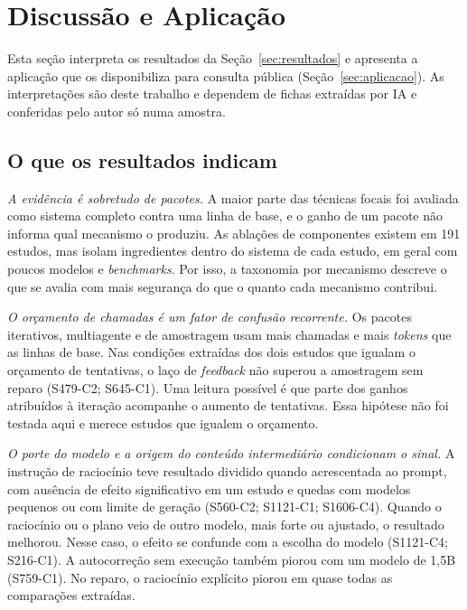 \section{Discussão e Aplicação}\label{sec:discussao}
Esta seção interpreta os resultados da Seção~\ref{sec:resultados} e apresenta a aplicação que os disponibiliza para
consulta pública (Seção~\ref{sec:aplicacao}). As interpretações são deste trabalho e
dependem de fichas extraídas por IA e conferidas pelo autor só numa amostra.

\subsection{O que os resultados indicam}
\textit{A evidência é sobretudo de pacotes.} A maior parte das técnicas focais foi avaliada como sistema completo
contra uma linha de base, e o ganho de um pacote não informa qual mecanismo o produziu. As ablações de componentes
existem em 191 estudos, mas isolam ingredientes dentro do sistema de cada estudo, em geral com poucos modelos e
\textit{benchmarks}. Por isso, a taxonomia por mecanismo descreve o que se avalia com mais segurança do que o
quanto cada mecanismo contribui.

\textit{O orçamento de chamadas é um fator de confusão recorrente.} Os pacotes iterativos, multiagente e de
amostragem usam mais chamadas e mais \textit{tokens} que as linhas de base. Nas condições extraídas dos dois estudos que igualam o
orçamento de tentativas, o laço de \textit{feedback} não superou a amostragem sem reparo (S479-C2; S645-C1).
Uma leitura possível é que parte dos ganhos atribuídos à iteração acompanhe o aumento de tentativas. Essa
hipótese não foi testada aqui e merece estudos que igualem o orçamento.

\textit{O porte do modelo e a origem do conteúdo intermediário condicionam o sinal.} A instrução de raciocínio
teve resultado dividido quando acrescentada ao prompt, com ausência de efeito significativo em um estudo e quedas com modelos
pequenos ou com limite de geração (S560-C2; S1121-C1; S1606-C4).
Quando o raciocínio ou o plano veio de outro modelo, mais forte ou ajustado, o resultado melhorou. Nesse caso, o
efeito se confunde com a escolha do modelo (S1121-C4; S216-C1). A autocorreção sem execução também piorou com um
modelo de 1,5B (S759-C1).
No reparo, o raciocínio explícito piorou em quase todas as comparações extraídas.

